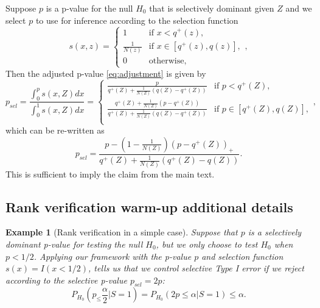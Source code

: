 \documentclass{article}
\newtheorem{example}{Example}
\begin{document}
\begin{appendix}
Suppose $p$ is a p-value for the null $H_0$ that is selectively dominant given $Z$ and we select $p$ to use for inference according to the selection function 
    \begin{equation*}
        s(x, z) = 
        \begin{cases} 
        1 & \text{if } x < q^+(z), \\
        \frac{1}{N(z)} & \text{if } x \in [q^+(z), q(z)], \\
        0 & \text{otherwise},
        \end{cases},
    \end{equation*}
Then the adjusted p-value \eqref{eq:adjustment} is given by 
\begin{equation*}
    p_{sel} = \frac{\int_0^p s(x, Z) dx }{\int_0^1 s(x, Z)dx} = 
        \begin{cases} 
        \frac{p}{q^{+}(Z) + \frac{1}{N(Z)}(q(Z) - q^{+}(Z)) }  & \text{if } p  < q^+(Z), \\
        \frac{q^{+}(Z)+ \frac{1}{N(Z)}(p - q^{+}(Z))}{q^{+}(Z) + \frac{1}{N(Z)}(q(Z) - q^{+}(Z)) } & \text{if } p \in [q^+(Z), q(Z)], \\
        \end{cases},
\end{equation*}
which can be re-written as 
\begin{equation*}
   p_{sel} = \frac{p - (1-\frac{1}{N(Z)})(p - q^+(Z))_+ }{q^+(Z) + \frac{1}{N(Z)}(q^+(Z) - q(Z))}.
\end{equation*}
This is sufficient to imply the claim from the main text. 


\subsection{Rank verification warm-up additional details}
\label{sec:rank_verification_warm_up_appdx}

\begin{example}[Rank verification in a simple case]
    \label{exm:rank_verification}
    Suppose that $p$ is a selectively dominant p-value for testing the null $H_0$, but we only choose to test $H_0$ when $p < 1/2$. Applying our framework with the p-value $p$ and selection function $s(x) = I(x < 1/2)$,  tells us that we control selective Type I error if we reject according to the selective p-value $p_{sel} = 2p$:
    \begin{equation}
        \label{eq:rank_verification_error_control}
        P_{H_{0}}\left(p_ \leq \frac{\alpha}{2} | S = 1\right) = P_{H_{0}}\left(2p \leq \alpha | S = 1\right) \leq \alpha.
    \end{equation} 
    

\end{example}
\end{appendix}
\end{document}

